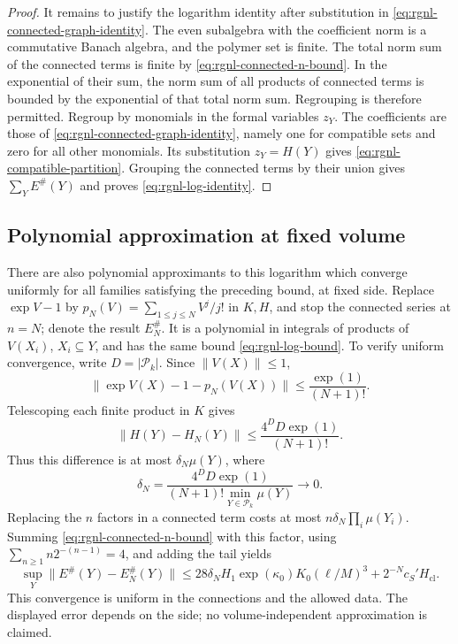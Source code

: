 \documentclass[11pt,letterpaper,reqno]{amsart}
\begin{document}
\begin{proof}
It remains to justify the logarithm identity after
substitution in \eqref{eq:rgnl-connected-graph-identity}.
The even subalgebra with the coefficient norm is a
commutative Banach algebra, and the polymer set is finite.
The total norm sum of the connected terms is finite by
\eqref{eq:rgnl-connected-n-bound}.
In the exponential of their sum, the norm sum of all
products of connected terms is bounded by the exponential
of that total norm sum. Regrouping is therefore permitted.
Regroup by monomials in the formal variables $z_Y$.
The coefficients are those of
\eqref{eq:rgnl-connected-graph-identity}, namely one
for compatible sets and zero for all other monomials.
Its substitution $z_Y=H(Y)$ gives
\eqref{eq:rgnl-compatible-partition}. Grouping the
connected terms by their union gives
$\sum_YE^\#(Y)$ and proves \eqref{eq:rgnl-log-identity}.
\end{proof}

\subsection{Polynomial approximation at fixed volume}\label{subsec:rgnl-polynomial-approximation}

There are also polynomial approximants to this logarithm
which converge uniformly for all families satisfying the
preceding bound, at fixed side. Replace $\exp V-1$ by
$p_N(V)=\sum_{1\le j\le N}V^j/j!$ in $K,H$, and stop
the connected series at $n=N$; denote the result $E_N^\#$.
It is a polynomial in integrals of products of $V(X_i)$,
$X_i\subseteq Y$, and has the same bound
\eqref{eq:rgnl-log-bound}. To verify uniform convergence,
write $D=|\mathcal P_k|$. Since $\|V(X)\|\le1$,
\[
 \|\exp V(X)-1-p_N(V(X))\|
                                  \le\frac{\exp(1)}{(N+1)!}.
\]
Telescoping each finite product in $K$ gives
\[
 \|H(Y)-H_N(Y)\|\le
                             \frac{4^DD\exp(1)}{(N+1)!}.
\]
Thus this difference is at most $\delta_N\mu(Y)$, where
\[
 \delta_N=\frac{4^DD\exp(1)}
                      {(N+1)!\min_{Y\in\mathcal P_k}\mu(Y)}
                                                   \longrightarrow0.
\]
Replacing the $n$ factors in a connected term costs at
most $n\delta_N\prod_i\mu(Y_i)$. Summing
\eqref{eq:rgnl-connected-n-bound} with this factor, using
$\sum_{n\ge1}n2^{-(n-1)}=4$, and adding the tail yields
\[
 \sup_Y\|E^\#(Y)-E_N^\#(Y)\|
 \le28\delta_NH_1\exp(\kappa_0)K_0(\ell/M)^3
                                  +2^{-N}c_S'H_{\mathrm{cl}}.
\]
This convergence is uniform in the connections and the
allowed data. The displayed error depends on the side;
no volume-independent approximation is claimed.
\end{document}
